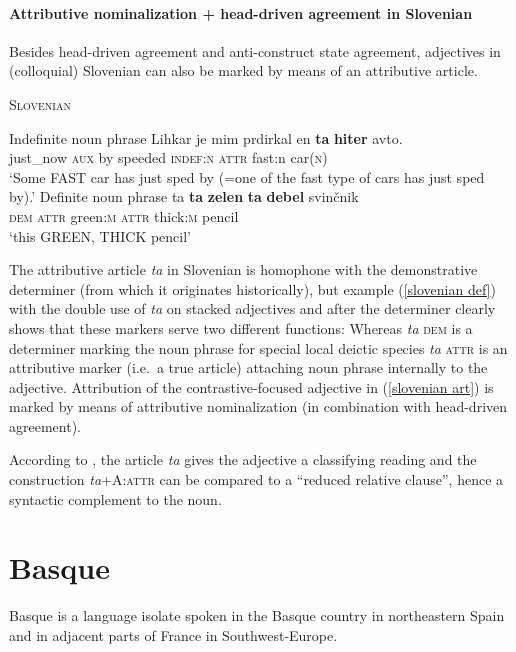 \paragraph{Attributive nominalization + head-driven agreement in Slovenian}
Besides head-driven agreement and anti-construct state agreement, adjectives in (colloquial) Slovenian can also be marked by means of an attributive article.
\begin{exe}
\ex \textsc{Slovenian} \citep{marusic-etal2007} \label{slovenian art}
\begin{xlist}
\ex Indefinite noun phrase
\gll	Lihkar je mim prdirkal en \textbf{ta} \textbf{hiter} avto.\\
	just\_now \textsc{aux} by speeded \textsc{indef:n} \textsc{attr} fast:n car(\textsc{n})\\
\glt	‘Some FAST car has just sped by (=one of the fast type of cars has just sped by).’ 
\ex Definite noun phrase \label{slovenian def}
\gll 	ta \textbf{ta} \textbf{zelen} \textbf{ta} \textbf{debel} svin\v{c}nik\\
	\textsc{dem} \textsc{attr} green\textsc{:m} \textsc{attr} thick\textsc{:m} pencil\\
\glt 	‘this GREEN, THICK pencil’
\end{xlist}
\end{exe}
The attributive article \textit{ta} in Slovenian is homophone with the demonstrative determiner (from which it originates historically), but example (\ref{slovenian def}) with the double use of \textit{ta} on stacked adjectives and after the determiner clearly shows that these markers serve two different functions: Whereas \textit{ta} \textsc{dem} is a determiner marking the noun phrase for special local deictic species \textit{ta} \textsc{attr} is an attributive marker (i.e.~a true article) attaching noun phrase internally to the adjective. Attribution of the contrastive-focused adjective in (\ref{slovenian art}) is marked by means of attributive nominalization (in combination with head-driven agreement).

According to \cite{marusic-etal2007}, the article \textit{ta} gives the adjective a classifying reading and the construction \textit{ta}+A:\textsc{attr} can be compared to a “reduced relative clause”, hence a syntactic complement to the noun.

\section{Basque}
Basque is a language isolate spoken in the Basque country in northeastern Spain and in adjacent parts of France in Southwest-Europe. 

